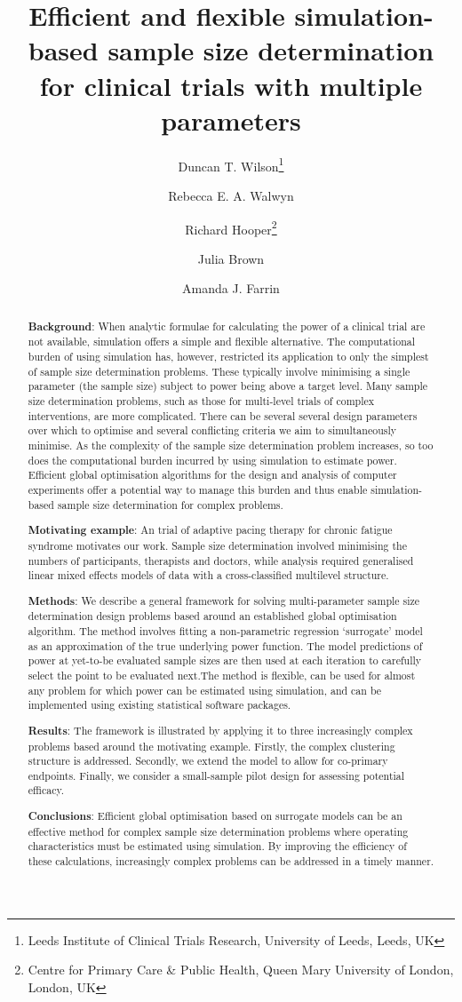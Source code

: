 \documentclass{article} %
\title{Efficient and flexible simulation-based sample size determination for clinical trials with multiple parameters}
\author{Duncan T. Wilson\thanks{Leeds Institute of Clinical Trials Research, University of Leeds, Leeds, UK}  \and Rebecca E. A. Walwyn\footnotemark[1] \and Richard Hooper\thanks{Centre for Primary Care \& Public Health, Queen Mary University of London, London, UK} \and Julia Brown\footnotemark[1] \and Amanda J. Farrin\footnotemark[1]}
\date{}
\begin{document}
\maketitle

\begin{abstract}
\textbf{Background}: When analytic formulae for calculating the power of a clinical trial are not available, simulation offers a simple and flexible alternative. The computational burden of using simulation has, however, restricted its application to only the simplest of sample size determination problems. These typically involve minimising a single parameter (the sample size) subject to power being above a target level. Many sample size determination problems, such as those for multi-level trials of complex interventions, are more complicated. There can be several several design parameters over which to optimise and several conflicting criteria we aim to simultaneously minimise. As the complexity of the sample size determination problem increases, so too does the computational burden incurred by using simulation to estimate power. Efficient global optimisation algorithms for the design and analysis of computer experiments offer a potential way to manage this burden and thus enable simulation-based sample size determination for complex problems.

\textbf{Motivating example}: An trial of adaptive pacing therapy for chronic fatigue syndrome motivates our work. Sample size determination involved minimising the numbers of participants, therapists and doctors, while analysis required generalised linear mixed effects models of data with a cross-classified multilevel structure.

\textbf{Methods}: We describe a general framework for solving multi-parameter sample size determination design problems based around an established global optimisation algorithm. The method involves fitting a non-parametric regression `surrogate' model as an approximation of the true underlying power function. The model predictions of power at yet-to-be evaluated sample sizes are then used at each iteration to carefully select the point to be evaluated next.The method is flexible, can be used for almost any problem for which power can be estimated using simulation, and can be implemented using existing statistical software packages.

\textbf{Results}: The framework is illustrated by applying it to three increasingly complex problems based around the motivating example. Firstly, the complex clustering structure is addressed. Secondly, we extend the model to allow for co-primary endpoints. Finally, we consider a small-sample pilot design for assessing potential efficacy.

\textbf{Conclusions}: Efficient global optimisation based on surrogate models can be an effective method for complex sample size determination problems where operating characteristics must be estimated using simulation. By improving the efficiency of these calculations, increasingly complex problems can be addressed in a timely manner.
\end{abstract}
\end{document}
